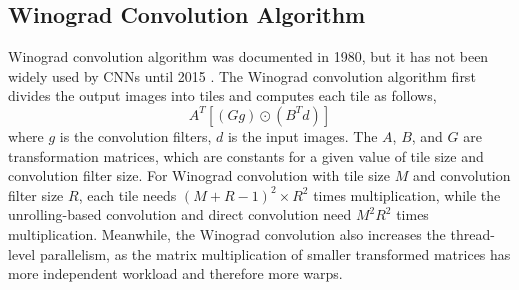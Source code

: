 \documentclass{article}
\begin{document}



\subsection{Winograd Convolution Algorithm}

Winograd convolution algorithm was documented in 1980, but it has not been widely used by CNNs until 2015 \cite{lavin2016fast}. The Winograd convolution algorithm first divides the output images into tiles and computes each tile as follows, $$A^{T}[(Gg) \odot (B^{T}d)]$$ where $g$ is the convolution filters, $d$ is the input images. The $A$, $B$, and $G$ are transformation matrices, which are constants for a given value of tile size and convolution filter size. For Winograd convolution with tile size $M$ and convolution filter size $R$, each tile needs $(M+R-1)^{2} \times R^{2}$ times multiplication, while the unrolling-based convolution and direct convolution need $M^{2}R^{2}$ times multiplication. Meanwhile, the Winograd convolution also increases the thread-level parallelism, as the matrix multiplication of smaller transformed matrices has more independent workload and therefore more warps.
\end{document}
